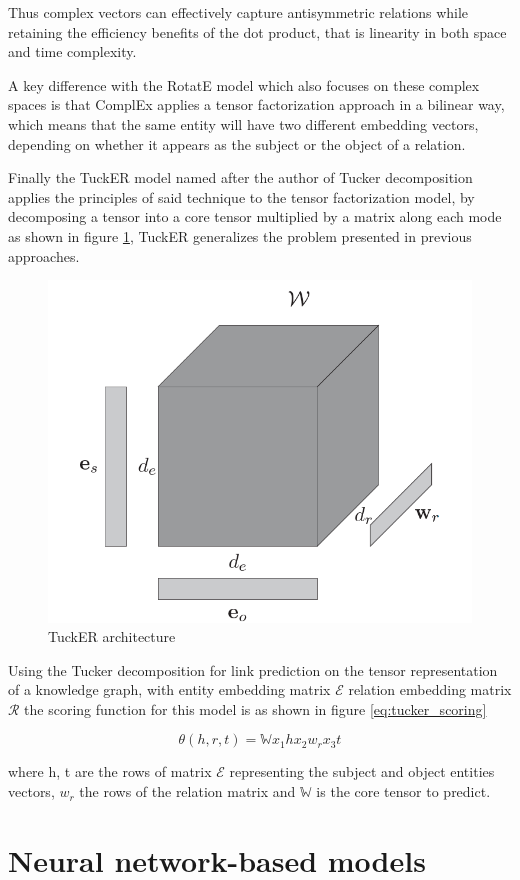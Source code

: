 Thus complex vectors can effectively capture antisymmetric relations while retaining the efficiency benefits of the dot product, that is linearity in both space and time complexity.

A key difference with the RotatE model which also focuses on these complex spaces is that ComplEx applies a tensor factorization approach in a bilinear way, which means that the same entity will have two different embedding vectors, depending on whether it appears as the subject or the object of a relation.

Finally the TuckER \cite{balavzevic2019tucker} model named after the author of Tucker decomposition \cite{tucker1966some} applies the principles of said technique to the tensor factorization model, by decomposing a tensor into a core tensor multiplied by a matrix along each mode as shown in figure \ref{fig:emb-tucker}, TuckER generalizes the problem presented in previous approaches.

\begin{figure}[!ht]
    \centering
    \includegraphics[width=.45\textwidth]{fig/embeddings/TuckER.png}
    \caption{TuckER \cite{balavzevic2019tucker} architecture}
    \label{fig:emb-tucker}
\end{figure}

Using the Tucker decomposition for link prediction on the tensor representation of a knowledge graph, with entity embedding matrix $\mathcal{E}$ relation embedding matrix $\mathcal{R}$ the scoring function for this model is as shown in figure \ref{eq:tucker_scoring}

\begin{equation}
    \label{eq:tucker_scoring}
    \theta (h, r, t) = \mathbb{W} x_1 h x_2 w_r x_3 t
\end{equation}

where h, t are the rows of matrix $\mathcal{E}$ representing the subject and object entities vectors, $w_r$ the rows of the relation matrix and $\mathbb{W}$ is the core tensor to predict.

\section{Neural network-based models}\label{sec:emb-nn}

